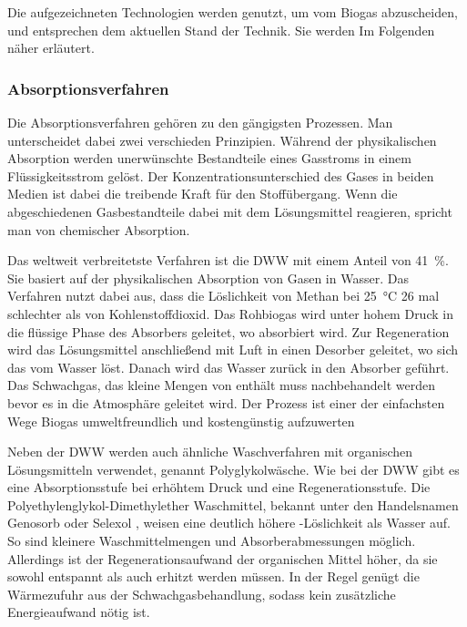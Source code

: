 


Die aufgezeichneten Technologien werden genutzt, um  vom Biogas abzuscheiden, und entsprechen dem aktuellen Stand der Technik. Sie werden Im Folgenden näher erläutert. 


\subsubsection{Absorptionsverfahren}\label{chap:absorp}

Die Absorptionsverfahren gehören zu den gängigsten Prozessen. Man unterscheidet dabei zwei verschieden Prinzipien. Während der physikalischen Absorption werden unerwünschte Bestandteile eines Gasstroms in einem Flüssigkeitsstrom gelöst. Der Konzentrationsunterschied des Gases in beiden Medien ist dabei die treibende Kraft für den Stoffübergang. Wenn die abgeschiedenen Gasbestandteile dabei mit dem Lösungsmittel reagieren, spricht man von chemischer Absorption. \parencite{Rasi09} \smallskip

Das weltweit verbreitetste Verfahren ist die \gls{DWW} mit einem Anteil von \SI{41}{\percent}. Sie basiert auf der physikalischen Absorption von Gasen in Wasser. Das Verfahren nutzt dabei aus, dass die Löslichkeit von Methan bei \SI{25}{\degreeCelsius} \SI{26}{\relax} mal schlechter als von Kohlenstoffdioxid. Das Rohbiogas wird unter hohem Druck in die flüssige Phase des Absorbers geleitet, wo  absorbiert wird. Zur Regeneration wird das Lösungsmittel anschließend mit Luft in einen Desorber geleitet, wo sich das  vom Wasser löst. Danach wird das Wasser zurück in den Absorber geführt. Das Schwachgas, das kleine Mengen von  enthält muss nachbehandelt werden bevor es in die Atmosphäre geleitet wird. Der Prozess ist einer der einfachsten Wege Biogas umweltfreundlich und kostengünstig aufzuwerten \parencite{KGKK2019} \parencite{BHPT13} \smallskip

Neben der \gls{DWW} werden auch ähnliche Waschverfahren mit organischen Lösungsmitteln verwendet, genannt Polyglykolwäsche. Wie bei der \gls{DWW} gibt es eine Absorptionsstufe bei erhöhtem Druck und eine Regenerationsstufe. Die Polyethylenglykol-Dimethylether Waschmittel, bekannt unter den Handelsnamen Genosorb \textsuperscript{\textregistered} oder Selexol \textsuperscript{\textregistered}, weisen eine deutlich höhere -Löslichkeit als Wasser auf. So sind kleinere Waschmittelmengen und Absorberabmessungen möglich. Allerdings ist der Regenerationsaufwand der organischen Mittel höher, da sie sowohl entspannt als auch erhitzt werden müssen. In der Regel genügt die Wärmezufuhr aus der Schwachgasbehandlung, sodass kein zusätzliche Energieaufwand nötig ist. \parencite{FNR14} \smallskip

